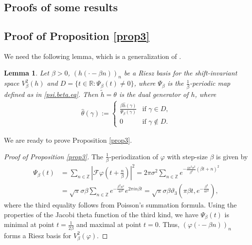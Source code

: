 \documentclass[11pt, reqno]{amsart}
\newtheorem{lemma}[theorem]{Lemma}%
\newcommand{\Z}{\mathbb{Z}}
\newcommand{\R}{\mathbb{R}}
\numberwithin{equation}{section}
\begin{document}
\begin{appendices}


\section{Proofs of some results}\label{app1}

\subsection{Proof of Proposition \ref{prop3}}\label{proof.prop3}

We  need the following lemma, which is a generalization of \cite[Proposition 9.4.2]{christensen2016introduction}.

\begin{lemma}\cite[Theorem 2.3]{grohs2024stable}\label{lem3}
	Let $\beta > 0$, $(h(\cdot-\beta n))_n$ be a Riesz basis for the shift-invariant space $V_{\beta}^2 (h)$ and $D= \{t\in \R: \Psi_{\beta}(t)\ne 0\}$, where $\Psi_{\beta}$ is the $\frac{1}{\beta}$-periodic map defined as in \eqref{psi.beta.eq}. Then $\tilde{h}= \theta$ is the dual generator of $h$, where
	\begin{align*}
		\hat{\theta}(\gamma) := 
		\begin{cases} 
			\frac{\beta \hat{h}(\gamma)}{\Psi_{\beta}(\gamma)} & \text{if } \gamma \in D, \\
			0 & \text{if } \gamma \notin D.
		\end{cases}
	\end{align*}
\end{lemma}

We are ready to prove Proposition \ref{prop3}.

\begin{proof}[Proof of Proposition \ref{prop3}]
        The $\frac{1}{\beta}$-periodization of $\varphi$ with step-size $\beta$ is given by
	\begin{align*}
		\Psi_{\beta} (t) {}& = \sum_{n \in \Z} | \mathcal{F}\varphi (t + \frac{n}{\beta})|^2 = 2 \pi \sigma^2 \sum_{n \in \Z} e^{- \frac{4 \pi^2 \sigma^2}{\beta^2} (\beta t + n)^2 } \\
		{}& = \sqrt{ \pi} \sigma \beta \sum_{n \in \Z} e^{-\frac{\beta^2 n^2}{4 \sigma^2}} e^{2 \pi i n \beta t} = \sqrt{ \pi} \sigma \beta \vartheta_3(\pi \beta t , e^{-\frac{\beta^2}{4 \sigma^2}}),
	\end{align*}
        where the third equality follows from Poisson's summation formula. Using the properties of the Jacobi theta function of the third kind, we have $\Psi_{\beta} (t)$ is minimal at point $t = \frac{1}{2 \beta}$ and maximal at point $t = 0$. Thus, $(\varphi(\cdot - \beta n))_n$ forms a Riesz basis for $V_{\beta}^{2}(\varphi)$.
        

\end{proof}
\end{appendices}
\end{document}

